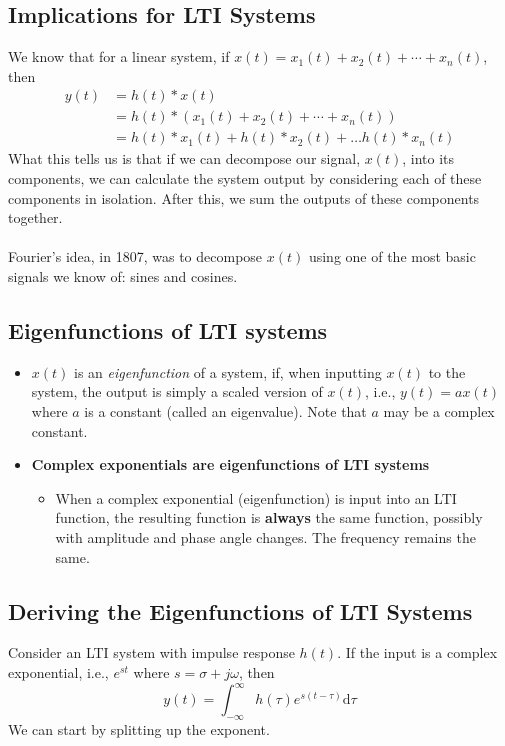 \documentclass[10pt]{article}
\begin{document}
\subsection*{Implications for LTI Systems}
We know that for a linear system, if $x(t) = x_1(t) + x_2(t) + \cdots + x_n(t)$, then
\begin{align*}
    y(t) &= h(t) * x(t)\\
    &= h(t) * (x_1(t) + x_2(t) + \cdots + x_n(t))\\
    &= h(t) * x_1(t) + h(t) * x_2(t) + \dots h(t) * x_n(t)
\end{align*}
What this tells us is that if we can decompose our signal, $x(t)$, into its components, we can calculate the system output by considering each of these components in isolation.  After this, we sum the outputs of these components together.\\\\
Fourier's idea, in 1807, was to decompose $x(t)$ using one of the most basic signals we know of: sines and cosines.

\subsection*{Eigenfunctions of LTI systems}
\begin{itemize}
    \item $x(t)$ is an \textit{eigenfunction} of a system, if, when inputting $x(t)$ to the system, the output is simply a scaled version of $x(t)$, i.e., $y(t) = ax(t)$ where $a$ is a constant (called an eigenvalue).  Note that $a$ may be a complex constant.
    \item \textbf{Complex exponentials are eigenfunctions of LTI systems}
    \begin{itemize}
        \item When a complex exponential (eigenfunction) is input into an LTI function, the resulting function is \textbf{always} the same function, possibly with amplitude and phase angle changes.  The frequency remains the same.
    \end{itemize}
\end{itemize}

\pagebreak
\subsection*{Deriving the Eigenfunctions of LTI Systems}
Consider an LTI system with impulse response $h(t)$.  If the input is a complex exponential, i.e., $e^{st}$ where $s = \sigma + j\omega$, then
\[y(t) = \int_{-\infty}^\infty h(\tau) e^{s(t - \tau)}\text{d}\tau\]
We can start by splitting up the exponent.
\end{document}
